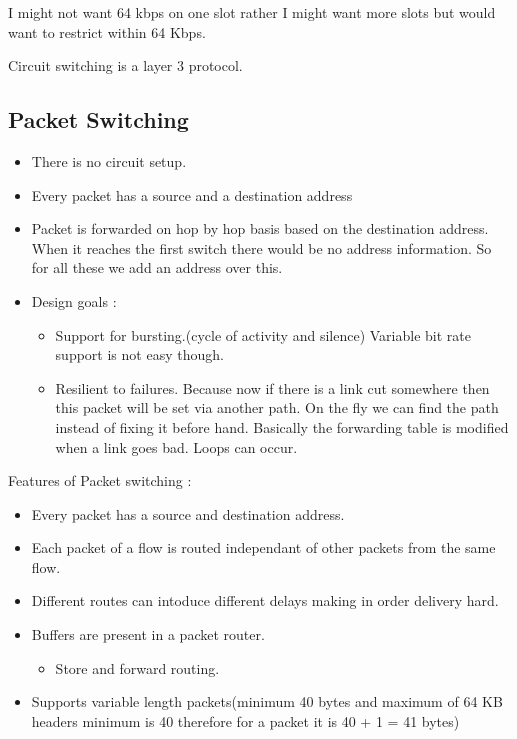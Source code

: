 \documentclass[solution,addpoints,12pt]{exam}
\begin{document}
I might not want 64 kbps on one slot rather I might want more
slots but would want to restrict within 64 Kbps.

Circuit  switching is a layer 3 protocol.

\subsection{Packet Switching}
\begin{itemize}
\item There is no circuit setup.
\item Every packet has a source and a destination address
\item Packet is forwarded on hop by hop basis
based on the destination address.
When it reaches the first switch there would be no address information.
So for all these we add an address over this.
\item Design goals :
\begin{itemize}
\item Support for bursting.(cycle of activity and silence)
Variable bit rate support is not easy though.
\item Resilient to failures. Because now if there is a link cut somewhere
then this packet will be set via another path. On the fly we can
find the path instead of fixing it before hand. Basically the forwarding
table is modified when a link goes bad. Loops can occur.
\end{itemize}
\end{itemize}
Features of Packet switching :\\
\begin{itemize}
\item Every packet has a source and destination address.
\item Each packet of a flow is routed independant of  other packets
from the same flow.
\item Different routes can intoduce different delays making
in order delivery hard.
\item Buffers are present in a packet router.
\begin{itemize}
\item Store and forward routing.
\end{itemize}
\item Supports variable length packets(minimum 40 bytes and maximum
of 64 KB headers minimum is 40 therefore for a packet it is 40 + 1 = 41 bytes)
\end{itemize}
\end{document}
